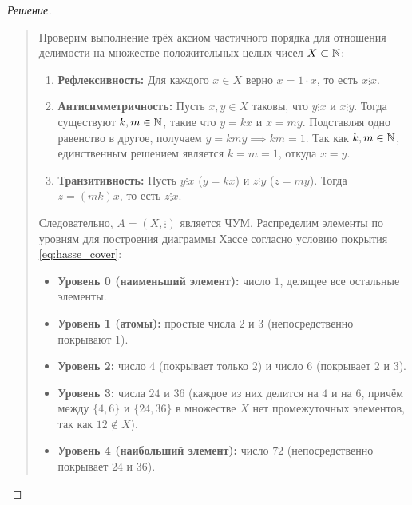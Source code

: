 \begin{proof}[Решение]~\\
    \begin{quote}
        Проверим выполнение трёх аксиом частичного порядка для отношения 
        делимости на множестве положительных целых чисел $X \subset \mathbb{N}$:
        \begin{enumerate}
            \item \textbf{Рефлексивность:} Для каждого $x \in X$ верно 
            $x = 1 \cdot x$, то есть $x \vdots x$.
            \item \textbf{Антисимметричность:} Пусть $x, y \in X$ таковы, 
            что $y \vdots x$ и $x \vdots y$. Тогда существуют 
            $k, m \in \mathbb{N}$, такие что $y = k x$ и $x = m y$. Подставляя 
            одно равенство в другое, получаем $y = k m y \implies k m = 1$. 
            Так как $k, m \in \mathbb{N}$, единственным решением является 
            $k = m = 1$, откуда $x = y$.
            \item \textbf{Транзитивность:} Пусть $y \vdots x$ ($y = k x$) 
            и $z \vdots y$ ($z = m y$). Тогда $z = (m k) x$, то есть 
            $z \vdots x$.
        \end{enumerate}
        Следовательно, $A = (X, \vdots)$ является ЧУМ. Распределим элементы 
        по уровням для построения диаграммы Хассе согласно условию 
        покрытия \eqref{eq:hasse_cover}:
        \begin{itemize}
            \item \textbf{Уровень 0 (наименьший элемент):} число $1$, 
            делящее все остальные элементы.
            \item \textbf{Уровень 1 (атомы):} простые числа $2$ и $3$ 
            (непосредственно покрывают $1$).
            \item \textbf{Уровень 2:} число $4$ (покрывает только $2$) и 
            число $6$ (покрывает $2$ и $3$).
            \item \textbf{Уровень 3:} числа $24$ и $36$ (каждое из них 
            делится на $4$ и на $6$, причём между $\{4, 6\}$ и $\{24, 36\}$ 
            в множестве $X$ нет промежуточных элементов, так как $12 \notin X$).
            \item \textbf{Уровень 4 (наибольший элемент):} число $72$ 
            (непосредственно покрывает $24$ и $36$).
        \end{itemize}


\end{quote}
\end{proof}
